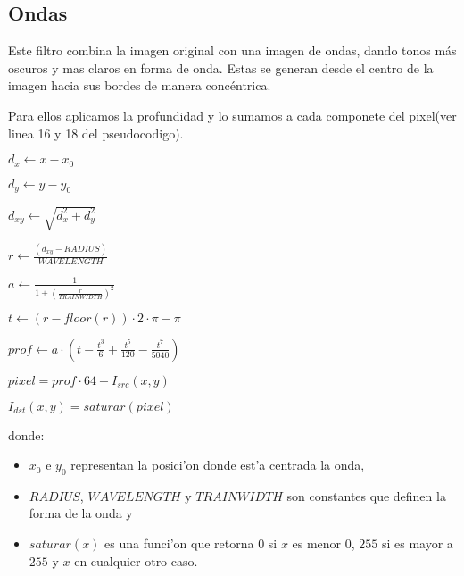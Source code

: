 \subsection{Ondas}

Este filtro combina la imagen original con una imagen de ondas, dando tonos más oscuros y mas claros en forma de onda. Estas se generan desde el centro de la imagen hacia sus bordes de manera concéntrica.

Para ellos aplicamos la profundidad y lo sumamos a cada componete del pixel(ver linea 16 y 18 del pseudocodigo). 

\begin{algorithm}[H]
  \begin{algorithmic}[1]
      \STATE $d_x \gets x - x_0$

      \STATE

      \STATE $d_y \gets y - y_0$

      \STATE

      \STATE $d_{xy} \gets \sqrt{d_{x}^2+d_{y}^2}$

      \STATE

      \STATE $r \gets \frac{(d_{xy} - RADIUS)}{WAVELENGTH}$

      \STATE

      \STATE $a \gets \frac{1}{1 + (\frac{r}{TRAINWIDTH})^2 }$

      \STATE

      \STATE $t \gets ( r-floor(r) ) \cdot 2 \cdot \pi - \pi$

      \STATE

      \STATE $prof \gets a \cdot (t - \frac{t^3}{6}+\frac{t^5}{120}-\frac{t^7}{5040})$

      \STATE

      \STATE $pixel = prof \cdot 64 + I_{src}(x, y)$    

      \STATE

      \STATE $I_{dst}(x, y) = saturar(pixel)$
    \ENDFOR
  \end{algorithmic}
  \caption{$ondas (I_{src}, I_{dst}, x_0, y_0)$}
  \label{alg:ondas}
\end{algorithm}

donde:

\begin{itemize}
  \item $x_0$ e $y_0$ representan la posici'on donde est'a centrada la onda,
  \item $RADIUS$, $WAVELENGTH$ y $TRAINWIDTH$ son constantes que definen la 
  forma de la onda y
  \item $saturar(x)$ es una funci'on que retorna $0$ si $x$ es menor $0$, $255$
  si es mayor a $255$ y $x$ en cualquier otro caso.
\end{itemize}

